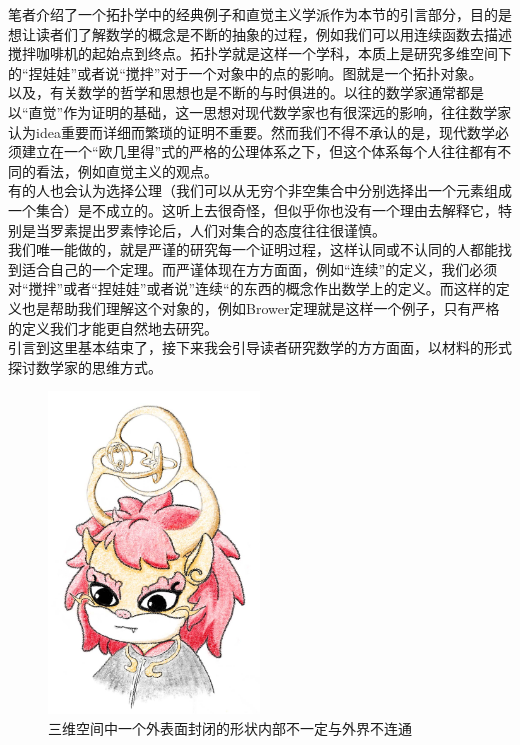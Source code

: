 \documentclass[UTF8,oneside,11pt]{book}
\theoremstyle{plain}\newtheorem{thm}{Theorem}
\theoremstyle{definition}\newtheorem{defn}[thm]{Definition}
\theoremstyle{plain}\newtheorem{axiom}[thm]{Axiom}
\theoremstyle{plain}\newtheorem{coro}[thm]{Corollary}
\theoremstyle{plain}\newtheorem{lemma}[thm]{Lemma}
\theoremstyle{plain}\newtheorem{prop}[thm]{Proposition}
\theoremstyle{plain}\newtheorem{conj}[thm]{Conjecture}
\theoremstyle{plain}\newtheorem{ques}[thm]{Problem}
\theoremstyle{plain}\newtheorem{const}[thm]{Construction}
\theoremstyle{remark}\newtheorem{notation}[thm]{Notation}
\theoremstyle{plain}\newtheorem*{app}{Application}
\theoremstyle{plain}\newtheorem*{exam}{Example}
\theoremstyle{plain}\newtheorem*{exer}{Exercise}
\theoremstyle{remark}\newtheorem*{remark}{Remark}
\theoremstyle{remark}\newtheorem*{note}{\small{Note}}
\numberwithin{equation}{section}
\numberwithin{thm}{section}
\begin{document}
笔者介绍了一个拓扑学中的经典例子和直觉主义学派作为本节的引言部分，目的是想让读者们了解数学的概念是不断的抽象的过程，例如我们可以用连续函数去描述搅拌咖啡机的起始点到终点。拓扑学就是这样一个学科，本质上是研究多维空间下的“捏娃娃”或者说“搅拌”对于一个对象中的点的影响。图就是一个拓扑对象。\\以及，有关数学的哲学和思想也是不断的与时俱进的。以往的数学家通常都是以“直觉”作为证明的基础，这一思想对现代数学家也有很深远的影响，往往数学家认为idea重要而详细而繁琐的证明不重要。然而我们不得不承认的是，现代数学必须建立在一个“欧几里得”式的严格的公理体系之下，但这个体系每个人往往都有不同的看法，例如直觉主义的观点。\\
有的人也会认为选择公理（我们可以从无穷个非空集合中分别选择出一个元素组成一个集合）是不成立的。这听上去很奇怪，但似乎你也没有一个理由去解释它，特别是当罗素提出罗素悖论后，人们对集合的态度往往很谨慎。\\
我们唯一能做的，就是严谨的研究每一个证明过程，这样认同或不认同的人都能找到适合自己的一个定理。而严谨体现在方方面面，例如“连续”的定义，我们必须对“搅拌”或者“捏娃娃”或者说”连续“的东西的概念作出数学上的定义。而这样的定义也是帮助我们理解这个对象的，例如Brower定理就是这样一个例子，只有严格的定义我们才能更自然地去研究。\\
引言到这里基本结束了，接下来我会引导读者研究数学的方方面面，以材料的形式探讨数学家的思维方式。
\begin{figure}[htb]
    \centering
    \includegraphics[width=0.5\textwidth]{麒麟.jpg}
    \caption{三维空间中一个外表面封闭的形状内部不一定与外界不连通}
    \label{麒麟图}
\end{figure}
\newpage
\end{document}
